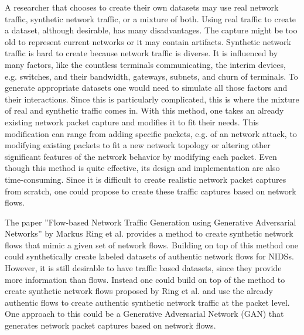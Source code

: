 \documentclass[
	ngerman,
	ruledheaders=section,%
	class=report,%
	thesis={type=bachelor},%
	accentcolor=9c,%
	custommargins=true,%
	marginpar=false,%
	parskip=half-,%
	fontsize=11pt,%
]{tudapub}
\begin{document}
A researcher that chooses to create their own datasets may use real network traffic, synthetic network traffic, or a mixture of both.
Using real traffic to create a dataset, although desirable, has many disadvantages.
The capture might be too old to represent current networks or
it may contain artifacts.
Synthetic network traffic is hard to create because network traffic is diverse.
It is influenced by many factors, like
the countless terminals communicating,
the interim devices, e.g. switches, and their bandwidth,
gateways, subnets, and churn of terminals.
To generate appropriate datasets one would need to simulate all those factors and their interactions.
Since this is particularly complicated,
this is where the mixture of real and synthetic traffic comes in.
With this method, one takes an already existing network packet capture and modifies it to fit their needs.
This modification can range from adding specific packets, e.g. of an network attack\cite{corderoID2TDIYDataset2015},
to modifying existing packets to fit a new network topology
or altering other significant features of the network behavior by modifying each packet.
Even though this method is quite effective, its design and implementation are also time-consuming.
Since it is difficult to create realistic network packet captures from scratch,
one could propose to create these traffic captures based on network flows.

The paper ''Flow-based Network Traffic Generation using Generative Adversarial Networks'' by Markus Ring et al. \cite{ringFlowbasedNetworkTraffic2019a} provides a method to create synthetic network flows that mimic a given set of network flows.
Building on top of this method one could synthetically create labeled datasets of authentic network flows for NIDSs.
However, it is still desirable to have traffic based datasets, since they provide more information than flows.
Instead one could build on top of the method to create synthetic network flows proposed by Ring et al. \cite{ringFlowbasedNetworkTraffic2019a} and
use the already authentic flows to create authentic synthetic network traffic at the packet level.
One approach to this could be a Generative Adversarial Network (GAN) that generates network packet captures based on network flows.
\end{document}
